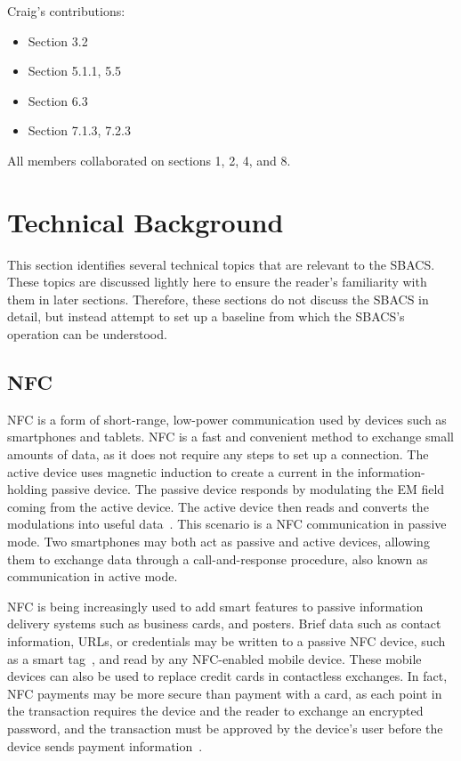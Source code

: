 \documentclass[12pt]{report}
\let\Oldsection\section
\renewcommand{\section}{\FloatBarrier\Oldsection}
\begin{document}
Craig's contributions:
\begin{itemize}
    \item Section 3.2
    \item Section 5.1.1, 5.5
    \item Section 6.3
    \item Section 7.1.3, 7.2.3
\end{itemize}

All members collaborated on sections 1, 2, 4, and 8.


\chapter{Technical Background} \label{technical-background}

This section identifies several technical topics that are relevant to the SBACS. These topics are discussed lightly here
to ensure the reader's familiarity with them in later sections. Therefore, these sections do not discuss the SBACS in
detail, but instead attempt to set up a baseline from which the SBACS's operation can be understood.


\section{NFC} \label{nfc}

NFC is a form of short-range, low-power communication used by devices such as smartphones and tablets. NFC is a fast
and convenient method to exchange small amounts of data, as it does not require any steps to set up a connection. The 
active device uses magnetic induction to create a current in the information-holding passive device. The
passive device responds by modulating the EM field coming from the active device. The active device then reads and
converts the modulations into useful data~\autocite{NFCORG}. This scenario is a NFC communication in passive mode. Two
smartphones may both act as passive and active devices, allowing them to exchange data through a call-and-response procedure,
also known as communication in active mode.

NFC is being increasingly used to add smart features to passive information delivery systems such as business cards, and posters.
Brief data such as contact information, URLs, or credentials may be written to a passive NFC device, such as a smart
tag~\autocite{NFCFORUMWHATIS}, and read by any NFC-enabled mobile device. These mobile devices can also be used to
replace credit cards in contactless exchanges. In fact, NFC payments may be more secure than payment with a card, as
each point in the transaction requires the device and the reader to exchange an encrypted password, and the transaction
must be approved by the device's user before the device sends payment information~\autocite{NFCPAYMENT}.
\end{document}
